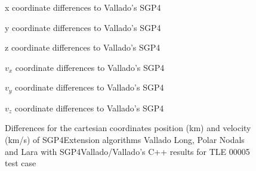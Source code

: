 \documentclass{article}
\begin{document}


\begin{figure}
  \begin{minipage}[b]{.48\linewidth}
    \centering
  
    \centerline{x coordinate differences to Vallado's SGP4}\medskip
  \end{minipage}
  \hfill
  \begin{minipage}[b]{0.48\linewidth}
      \centering
      
  \centerline{y coordinate differences to Vallado's SGP4}\medskip
  \end{minipage}
  \hfill
  \begin{minipage}[b]{0.48\linewidth}
    \centering
      
  \centerline{z coordinate differences to Vallado's SGP4}\medskip
  \end{minipage}
  \hfill
  \begin{minipage}[b]{0.48\linewidth}
    \centering
      
    \centerline{$v_x$ coordinate differences to Vallado's SGP4}\medskip
  \end{minipage}
  \hfill
  \begin{minipage}[b]{0.48\linewidth}
    \centering
      
    \centerline{$v_y$ coordinate differences to Vallado's SGP4}\medskip
  \end{minipage}
  \hfill
  \begin{minipage}[b]{0.48\linewidth}
    \centering
      
    \centerline{$v_z$ coordinate differences to Vallado's SGP4}\medskip
  \end{minipage}
  \caption{Differences for the cartesian coordinates position (km) and velocity (km/s) of SGP4Extension algorithms Vallado Long, Polar Nodals and Lara with SGP4Vallado/Vallado's C++ results for TLE 00005 test case}
\label{fig:pv0005}
\end{figure}
\end{document}
